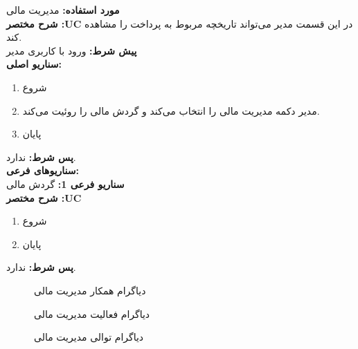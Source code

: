\textbf{مورد استفاده:}
مدیریت مالی
\\
\textbf{شرح مختصر :UC}
در این قسمت مدیر می‌تواند تاریخچه مربوط به پرداخت را مشاهده ‌کند.
\\
\textbf{پيش شرط:}
ورود با کاربری مدیر
\\
\textbf{سناريو اصلی:}
\begin{enumerate}
	\item
	شروع
	\item
	مدیر دکمه مدیریت مالی را انتخاب می‌کند و گردش مالی را روئیت می‌کند.
	\item
	پایان
\end{enumerate}

\noindent
\textbf{پس شرط:}
ندارد.
\\
\textbf{سناريوهای فرعی:}
\\
\textbf{سناريو فرعی 1:}
گردش مالی
\\
\textbf{شرح مختصر :UC}

\begin{enumerate}
	\item
	شروع
	\item
	پایان
\end{enumerate}

\noindent
\textbf{پس شرط:}
ندارد.


\begin{figure}[H]
	\centering
	\caption{دیاگرام همکار مدیریت مالی}
	\label{fig:c:مدیریت-مالی}
\end{figure}
\begin{figure}[H]
	\centering
	\caption{دیاگرام فعالیت مدیریت مالی}
	\label{fig:a:مدیریت-مالی}
\end{figure}
\begin{figure}[H]
	\caption{دیاگرام توالی مدیریت مالی}
	\centering
	\label{fig:s:مدیریت-مالی}
\end{figure}
